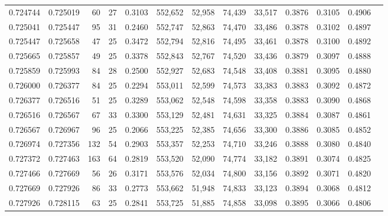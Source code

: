 \begin{tabular}{rrrrrrrrrrrrr}
0.724744 & 0.725019 &    60 &  27 &                                     0.3103 & 552,652 &  52,958 &  74,439 &  33,517 & 0.3876 & 0.3105 & 0.4906 \\
0.725041 & 0.725447 &    95 &  31 &                                     0.2460 & 552,747 &  52,863 &  74,470 &  33,486 & 0.3878 & 0.3102 & 0.4897 \\
0.725447 & 0.725658 &    47 &  25 &                                     0.3472 & 552,794 &  52,816 &  74,495 &  33,461 & 0.3878 & 0.3100 & 0.4892 \\
0.725665 & 0.725857 &    49 &  25 &                                     0.3378 & 552,843 &  52,767 &  74,520 &  33,436 & 0.3879 & 0.3097 & 0.4888 \\
0.725859 & 0.725993 &    84 &  28 &                                     0.2500 & 552,927 &  52,683 &  74,548 &  33,408 & 0.3881 & 0.3095 & 0.4880 \\
0.726000 & 0.726377 &    84 &  25 &                                     0.2294 & 553,011 &  52,599 &  74,573 &  33,383 & 0.3883 & 0.3092 & 0.4872 \\
0.726377 & 0.726516 &    51 &  25 &                                     0.3289 & 553,062 &  52,548 &  74,598 &  33,358 & 0.3883 & 0.3090 & 0.4868 \\
0.726516 & 0.726567 &    67 &  33 &                                     0.3300 & 553,129 &  52,481 &  74,631 &  33,325 & 0.3884 & 0.3087 & 0.4861 \\
0.726567 & 0.726967 &    96 &  25 &                                     0.2066 & 553,225 &  52,385 &  74,656 &  33,300 & 0.3886 & 0.3085 & 0.4852 \\
0.726974 & 0.727356 &   132 &  54 &                                     0.2903 & 553,357 &  52,253 &  74,710 &  33,246 & 0.3888 & 0.3080 & 0.4840 \\
0.727372 & 0.727463 &   163 &  64 &                                     0.2819 & 553,520 &  52,090 &  74,774 &  33,182 & 0.3891 & 0.3074 & 0.4825 \\
0.727466 & 0.727669 &    56 &  26 &                                     0.3171 & 553,576 &  52,034 &  74,800 &  33,156 & 0.3892 & 0.3071 & 0.4820 \\
0.727669 & 0.727926 &    86 &  33 &                                     0.2773 & 553,662 &  51,948 &  74,833 &  33,123 & 0.3894 & 0.3068 & 0.4812 \\
0.727926 & 0.728115 &    63 &  25 &                                     0.2841 & 553,725 &  51,885 &  74,858 &  33,098 & 0.3895 & 0.3066 & 0.4806 \\

\end{tabular}
